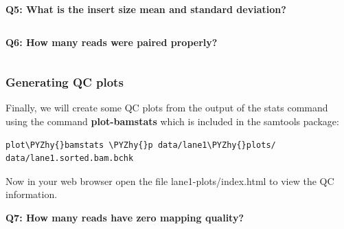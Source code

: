 \documentclass[11pt]{article}
\makeatletter
\def\PYZhy{\char`\-}
\newcommand{\boxspacing}{\kern\kvtcb@left@rule\kern\kvtcb@boxsep}
\newcommand{\prompt}[4]{
        {\ttfamily\llap{{\color{#2}[#3]:\hspace{3pt}#4}}\vspace{-\baselineskip}}
    }
\makeatother
\begin{document}
    \textbf{Q5: What is the insert size mean and standard deviation?}

    \begin{tcolorbox}[breakable, size=fbox, boxrule=1pt, pad at break*=1mm,colback=cellbackground, colframe=cellborder]
\prompt{In}{incolor}{ }{\boxspacing}
\begin{Verbatim}[commandchars=\\\{\}]

\end{Verbatim}
\end{tcolorbox}

    \textbf{Q6: How many reads were paired properly?}

    \begin{tcolorbox}[breakable, size=fbox, boxrule=1pt, pad at break*=1mm,colback=cellbackground, colframe=cellborder]
\prompt{In}{incolor}{ }{\boxspacing}
\begin{Verbatim}[commandchars=\\\{\}]

\end{Verbatim}
\end{tcolorbox}

    \hypertarget{generating-qc-plots}{%
\subsubsection{Generating QC plots}\label{generating-qc-plots}}

Finally, we will create some QC plots from the output of the stats
command using the command \textbf{plot-bamstats} which is included in
the samtools package:

    \begin{tcolorbox}[breakable, size=fbox, boxrule=1pt, pad at break*=1mm,colback=cellbackground, colframe=cellborder]
\prompt{In}{incolor}{ }{\boxspacing}
\begin{Verbatim}[commandchars=\\\{\}]
plot\PYZhy{}bamstats \PYZhy{}p data/lane1\PYZhy{}plots/ data/lane1.sorted.bam.bchk
\end{Verbatim}
\end{tcolorbox}

    Now in your web browser open the file lane1-plots/index.html to view the
QC information.

\textbf{Q7: How many reads have zero mapping quality?}

    \begin{tcolorbox}[breakable, size=fbox, boxrule=1pt, pad at break*=1mm,colback=cellbackground, colframe=cellborder]
\prompt{In}{incolor}{ }{\boxspacing}
\begin{Verbatim}[commandchars=\\\{\}]

\end{Verbatim}
\end{tcolorbox}
\end{document}
